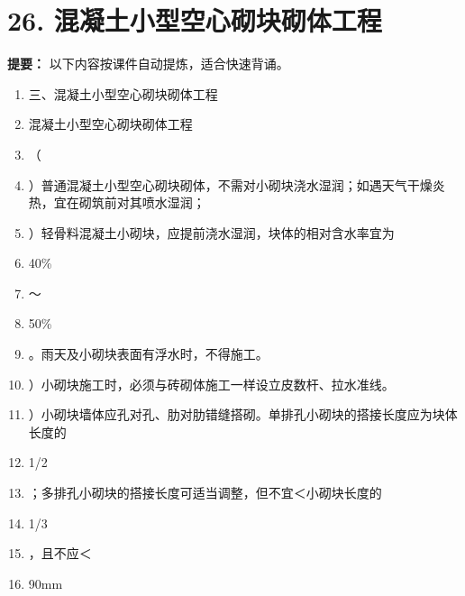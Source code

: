 \documentclass[UTF8,fontset=fandol,11pt]{ctexart}
\begin{document}
\newpage

\section*{26. 混凝土小型空心砌块砌体工程}


\begin{mainbox}

\textbf{提要：} 以下内容按课件自动提炼，适合快速背诵。

\end{mainbox}

\begin{enumerate}[label=\arabic*.]

\item 三、混凝土小型空心砌块砌体工程

\item 混凝土小型空心砌块砌体工程

\item （

\item ）普通混凝土小型空心砌块砌体，不需对小砌块浇水湿润；如遇天气干燥炎热，宜在砌筑前对其喷水湿润；

\item ）轻骨料混凝土小砌块，应提前浇水湿润，块体的相对含水率宜为

\item 40\%

\item ～

\item 50\%

\item 。雨天及小砌块表面有浮水时，不得施工。

\item ）小砌块施工时，必须与砖砌体施工一样设立皮数杆、拉水准线。

\item ）小砌块墙体应孔对孔、肋对肋错缝搭砌。单排孔小砌块的搭接长度应为块体长度的

\item 1/2

\item ；多排孔小砌块的搭接长度可适当调整，但不宜＜小砌块长度的

\item 1/3

\item ，且不应＜

\item 90mm


\end{enumerate}
\end{document}
